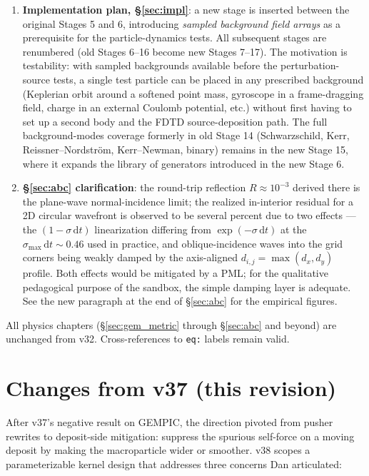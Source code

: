 \documentclass[11pt,a4paper]{article}
\newcommand{\dd}{\mathrm{d}}
\begin{document}
\begin{enumerate}
  \item \textbf{Implementation plan, §\ref{sec:impl}}: a new stage is inserted between the original Stages 5 and 6, introducing \emph{sampled background field arrays} as a prerequisite for the particle-dynamics tests.  All subsequent stages are renumbered (old Stages 6--16 become new Stages 7--17).  The motivation is testability: with sampled backgrounds available before the perturbation-source tests, a single test particle can be placed in any prescribed background (Keplerian orbit around a softened point mass, gyroscope in a frame-dragging field, charge in an external Coulomb potential, etc.) without first having to set up a second body and the FDTD source-deposition path.  The full background-modes coverage formerly in old Stage 14 (Schwarzschild, Kerr, Reissner--Nordstr\"om, Kerr--Newman, binary) remains in the new Stage 15, where it expands the library of generators introduced in the new Stage 6.
  \item \textbf{§\ref{sec:abc} clarification}: the round-trip reflection $R\approx10^{-3}$ derived there is the plane-wave normal-incidence limit; the realized in-interior residual for a 2D circular wavefront is observed to be several percent due to two effects --- the $(1-\sigma\,\dd t)$ linearization differing from $\exp(-\sigma\,\dd t)$ at the $\sigma_{\max}\,\dd t\sim0.46$ used in practice, and oblique-incidence waves into the grid corners being weakly damped by the axis-aligned $d_{i,j}=\max(d_x,d_y)$ profile.  Both effects would be mitigated by a PML; for the qualitative pedagogical purpose of the sandbox, the simple damping layer is adequate.  See the new paragraph at the end of §\ref{sec:abc} for the empirical figures.
\end{enumerate}

All physics chapters (§\ref{sec:gem_metric} through §\ref{sec:abc} and beyond) are unchanged from v32.  Cross-references to \texttt{eq:} labels remain valid.

\newpage

\section*{Changes from v37 (this revision)}

After v37's negative result on GEMPIC, the direction pivoted from
pusher rewrites to deposit-side mitigation: suppress the spurious
self-force on a moving deposit by making the macroparticle wider
or smoother.  v38 scopes a parameterizable kernel design that
addresses three concerns Dan articulated:
\end{document}
